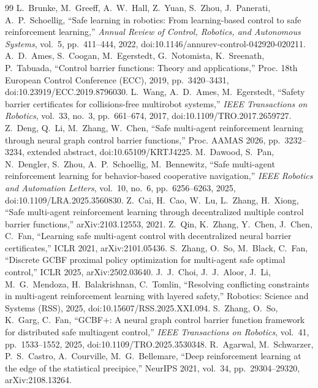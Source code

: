 \documentclass[11pt]{article}
\begin{document}
\begin{thebibliography}{99}
 L.~Brunke, M.~Greeff, A.~W.~Hall, Z.~Yuan, S.~Zhou, J.~Panerati, A.~P.~Schoellig, ``Safe learning in robotics: From learning-based control to safe reinforcement learning,'' \emph{Annual Review of Control, Robotics, and Autonomous Systems}, vol.~5, pp.~411--444, 2022, doi:10.1146/annurev-control-042920-020211.
 A.~D.~Ames, S.~Coogan, M.~Egerstedt, G.~Notomista, K.~Sreenath, P.~Tabuada, ``Control barrier functions: Theory and applications,'' Proc. 18th European Control Conference (ECC), 2019, pp.~3420--3431, doi:10.23919/ECC.2019.8796030.
 L.~Wang, A.~D.~Ames, M.~Egerstedt, ``Safety barrier certificates for collisions-free multirobot systems,'' \emph{IEEE Transactions on Robotics}, vol.~33, no.~3, pp.~661--674, 2017, doi:10.1109/TRO.2017.2659727.
 Z.~Deng, Q.~Li, M.~Zhang, W.~Chen, ``Safe multi-agent reinforcement learning through neural graph control barrier functions,'' Proc. AAMAS 2026, pp.~3232--3234, extended abstract, doi:10.65109/KRTJ4225.
 M.~Dawood, S.~Pan, N.~Dengler, S.~Zhou, A.~P.~Schoellig, M.~Bennewitz, ``Safe multi-agent reinforcement learning for behavior-based cooperative navigation,'' \emph{IEEE Robotics and Automation Letters}, vol.~10, no.~6, pp.~6256--6263, 2025, doi:10.1109/LRA.2025.3560830.
 Z.~Cai, H.~Cao, W.~Lu, L.~Zhang, H.~Xiong, ``Safe multi-agent reinforcement learning through decentralized multiple control barrier functions,'' arXiv:2103.12553, 2021.
 Z.~Qin, K.~Zhang, Y.~Chen, J.~Chen, C.~Fan, ``Learning safe multi-agent control with decentralized neural barrier certificates,'' ICLR 2021, arXiv:2101.05436.
 S.~Zhang, O.~So, M.~Black, C.~Fan, ``Discrete GCBF proximal policy optimization for multi-agent safe optimal control,'' ICLR 2025, arXiv:2502.03640.
 J.~J.~Choi, J.~J.~Aloor, J.~Li, M.~G.~Mendoza, H.~Balakrishnan, C.~Tomlin, ``Resolving conflicting constraints in multi-agent reinforcement learning with layered safety,'' Robotics: Science and Systems (RSS), 2025, doi:10.15607/RSS.2025.XXI.094.
 S.~Zhang, O.~So, K.~Garg, C.~Fan, ``GCBF+: A neural graph control barrier function framework for distributed safe multiagent control,'' \emph{IEEE Transactions on Robotics}, vol.~41, pp.~1533--1552, 2025, doi:10.1109/TRO.2025.3530348.
 R.~Agarwal, M.~Schwarzer, P.~S.~Castro, A.~Courville, M.~G.~Bellemare, ``Deep reinforcement learning at the edge of the statistical precipice,'' NeurIPS 2021, vol.~34, pp.~29304--29320, arXiv:2108.13264.

\end{thebibliography}
\end{document}
